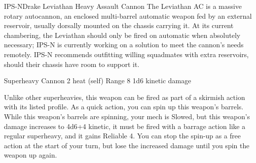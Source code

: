 \begin{mech}{IPS-N}{Drake}
Leviathan Heavy Assault Cannon
The Leviathan AC is a massive rotary autocannon, an enclosed multi-barrel automatic weapon fed by an external reservoir, usually dorsally mounted on the chassis carrying it. At its current chambering, the Leviathan should only be fired on automatic when absolutely necessary; IPS-N is currently working on a solution to meet the cannon's needs remotely. IPS-N recommends outfitting willing squadmates with extra reservoirs, should their chassis have room to support it.

Superheavy Cannon
2 heat (self)
Range 8
1d6 kinetic damage

Unlike other superheavies, this weapon can be fired as part of a skirmish action with its listed profile.
As a quick action, you can spin up this weapon's barrels. While this weapon's barrels are spinning, your mech is Slowed, but this weapon's damage increases to 4d6+4 kinetic, it must be fired with a barrage action like a regular superheavy, and it gains Reliable 4. You can stop the spin-up as a free action at the start of your turn, but lose the increased damage until you spin the weapon up again.


\end{mech}
